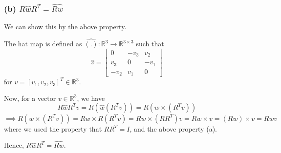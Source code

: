 \subsubsection*{(b) \( R \hat{w} R^{T} =\widehat{R w} \)}

We can show this by the above property.

The hat map is defined as \( \hat{(.)}: \mathbb{R}^{3} \rightarrow \mathbb{R}^{3 \times 3} \) such that
\[
    \hat{v} = \begin{bmatrix}
        0      & -v_{3} & v_{2}  \\
        v_{3}  & 0      & -v_{1} \\
        -v_{2} & v_{1}  & 0
    \end{bmatrix}
\]
for \( v = [v_{1}, v_{2}, v_{3}]^{T} \in \mathbb{R}^{3} \).

Now, for a vector \( v \in \mathbb{R}^{3} \), we have
\[
    R \hat{w} R^{T} v
    =
    R (\hat{w} (R^{T} v))
    =
    R (w \times (R^{T} v))
\]
\[
    \implies
    R (w \times (R^{T} v))
    =
    R w \times R(R^{T} v)
    =
    R w \times (RR^{T}) v
    =
    R w \times v
    =
    (R w) \times v
    =
    \widehat{R w} v
\]
where we used the property that \( R R^{T} = I \), and the above property (a).

Hence, \( \boxed{ R \hat{w} R^{T} = \widehat{R w} } \).
